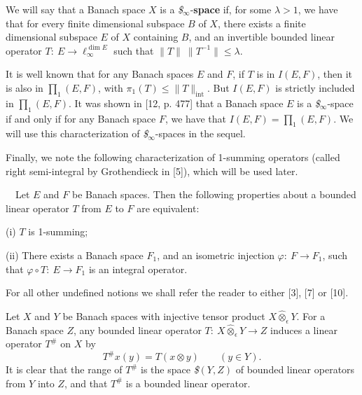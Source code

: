 \medskip

We will say that a Banach
space $X$ is a {\it \$}$_\infty$-{\bf space} if, for some $\lambda>1$, 
we have
that for every finite dimensional subspace $B$ of $X$, there exists a 
finite
dimensional subspace $E$ of $X$ containing $B$, and an invertible 
bounded
linear operator $T:\ E\longrightarrow \ell^{\dim E}_\infty$ such that
$\parallel T\parallel\ \parallel T^{-1}\parallel\leq \lambda$.

\medskip

It is well known that for any
Banach spaces $E$ and $F$, if $T$ is in $I(E,F)$, then it is also in
$\prod_1(E,F)$, with $\pi_1(T)\leq \parallel T\parallel_{\text 
{int}}$.  But
$I(E,F)$ is strictly included in $\prod_1(E,F)$.    It was shown
in [12, p. 477] that a Banach space $E$ is a {\it \$}$_\infty$-space 
if and only
if for any Banach space $F$, we have that $I(E,F)=\prod_1(E,F)$. We 
will use
this characterization of {\it \$}$_\infty$-spaces in the sequel.

\medskip

Finally, we note the following characterization of 1-summing operators
(called right semi-integral by Grothendieck in [5]), which will be 
used
later.

\medskip

\ \ Let $E$ and $F$ be Banach spaces. 
Then
the following properties about a bounded linear operator $T$ from $E$ 
to
$F$ are equivalent:

\item {(i)} $T$ is 1-summing;

\item {(ii)} There exists a Banach space $F_1$, and an isometric
injection $\varphi:\ F\longrightarrow F_1$, such that $\varphi\circ 
T:\
E\longrightarrow F_1$ is an integral operator.

\medskip

For all other undefined notions we shall refer the reader to either 
[3],
[7] or [10].

\vfill\eject
{}

Let $X$ and $Y$ be Banach spaces with injective tensor
product $X\hat \otimes_\epsilon Y$.  For
a Banach space $Z$, any bounded linear operator $T:\ X\hat
\otimes_\epsilon Y\longrightarrow Z$ induces a linear
operator $T^\#$ on $X$ by
$$
T^\#x(y)=T(x\otimes y) \qquad (y\in Y) .
$$
It is clear that the range of $T^\#$ is the space {\it \$}$(Y,Z)$ of
bounded linear operators from $Y$ into $Z$, and that $T^\#$ is a 
bounded
linear operator.

